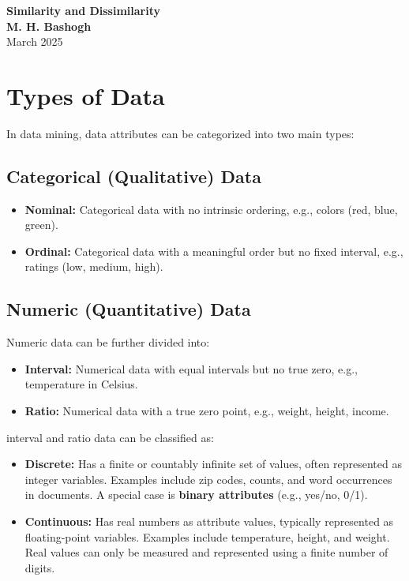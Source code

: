 \documentclass[a4paper,12pt]{article}
\begin{document}
\begin{titlepage}
    \begin{center}
        {\Huge\textbf{Similarity and Dissimilarity}}\\[0.5cm]
        {\Large  \textbf{M. H. Bashogh}}\\[2cm]
        {\large March 2025}\\[2cm]
    \end{center}
\end{titlepage}

\section{Types of Data}

In data mining, data attributes can be categorized into two main types:

\subsection{Categorical (Qualitative) Data}
\begin{itemize}
    \item \textbf{Nominal:} Categorical data with no intrinsic ordering, e.g., colors (red, blue, green).
    \item \textbf{Ordinal:} Categorical data with a meaningful order but no fixed interval, e.g., ratings (low, medium, high).
\end{itemize}

\subsection{Numeric (Quantitative) Data}
Numeric data can be further divided into:
\begin{itemize}
    \item \textbf{Interval:} Numerical data with equal intervals but no true zero, e.g., temperature in Celsius.
    \item \textbf{Ratio:} Numerical data with a true zero point, e.g., weight, height, income.
\end{itemize}

interval and ratio data can be classified as:
\begin{itemize}
    \item \textbf{Discrete:} Has a finite or countably infinite set of values, often represented as integer variables. Examples include zip codes, counts, and word occurrences in documents. A special case is \textbf{binary attributes} (e.g., yes/no, 0/1).
    \item \textbf{Continuous:} Has real numbers as attribute values, typically represented as floating-point variables. Examples include temperature, height, and weight. Real values can only be measured and represented using a finite number of digits.
\end{itemize}
\end{document}
